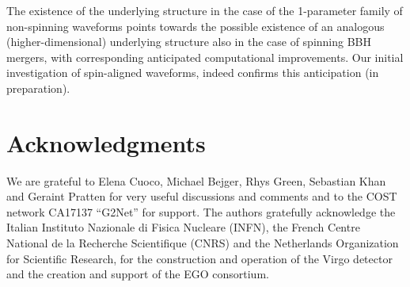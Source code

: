 \documentclass[preprint,12pt]{elsarticle}
\begin{document}
The existence of the underlying structure in the case of the 1-parameter family of non-spinning waveforms points towards the possible existence of an analogous (higher-dimensional) underlying structure also in the case of spinning BBH mergers, with corresponding anticipated computational improvements. Our initial investigation of spin-aligned waveforms, indeed confirms this anticipation (in preparation).

\section*{Acknowledgments}

We are grateful to Elena Cuoco, Michael Bejger, Rhys Green, Sebastian Khan and Geraint Pratten for very useful discussions and comments and to the COST network CA17137 “G2Net” for support. The authors gratefully acknowledge the Italian Instituto Nazionale di Fisica Nucleare (INFN), the French Centre National de la Recherche Scientifique (CNRS) and the Netherlands Organization for Scientific Research, for the construction and operation of the Virgo detector and the creation and support  of the EGO consortium. 

  
 





\end{document}
